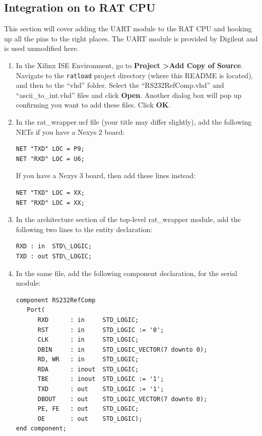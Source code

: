 \documentclass[notitlepage]{article}
\begin{document}
\subsection{Integration on to RAT CPU}
This section will cover adding the UART module to the RAT CPU and hooking up all the pins to the right places. The UART module is provided by Digilent and is used unmodified here.
\begin {enumerate}
\item In the Xilinx ISE Environment, go to \textbf{Project \textgreater Add Copy of Source}. Navigate to the \texttt{ratload} project directory (where this README is located), and then to the ``vhd'' folder. Select the ``RS232RefComp.vhd'' and ``ascii\_to\_int.vhd'' files and click \textbf{Open}. Another dialog box will pop up confirming you want to add these files. Click \textbf{OK}.

\item In the rat\_wrapper.ucf file (your title may differ slightly), add the following NETs if you have a Nexys 2 board:
\begin{lstlisting}
NET "TXD" LOC = P9;
NET "RXD" LOC = U6;
\end{lstlisting}

If you have a Nexys 3 board, then add these lines instead:
\begin{lstlisting}
NET "TXD" LOC = XX;
NET "RXD" LOC = XX;
\end{lstlisting}

\item In the architecture section of the top-level rat\_wrapper module, add the following two lines to the entity declaration:
\begin{lstlisting}
RXD : in  STD\_LOGIC;
TXD : out STD\_LOGIC;
\end{lstlisting}

\item In the same file, add the following component declaration, for the serial module:
  \begin{lstlisting}
component RS232RefComp
   Port(
      RXD      : in     STD_LOGIC;
      RST      : in     STD_LOGIC := '0';
      CLK      : in     STD_LOGIC;
      DBIN     : in     STD_LOGIC_VECTOR(7 downto 0);
      RD, WR   : in     STD_LOGIC;
      RDA      : inout  STD_LOGIC;
      TBE      : inout  STD_LOGIC := '1';
      TXD      : out    STD_LOGIC := '1';
      DBOUT    : out    STD_LOGIC_VECTOR(7 downto 0);
      PE, FE   : out    STD_LOGIC;
      OE       : out    STD_LOGIC);
end component;
\end{lstlisting}


\end{enumerate}
\end{document}

